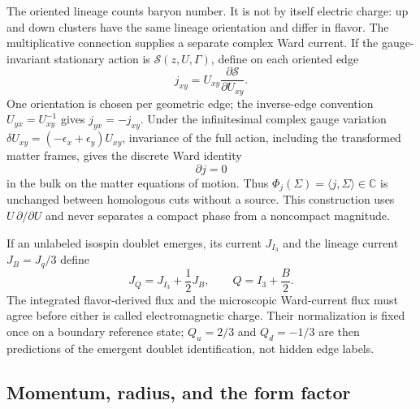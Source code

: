 \documentclass[11pt,letterpaper]{article}
\begin{document}
The oriented lineage counts baryon number. It is not by itself electric
charge: up and down clusters have the same lineage orientation and differ in
flavor. The multiplicative connection supplies a separate complex Ward
current. If the gauge-invariant stationary action is $\mathcal S(z,U,\Gamma)$,
define on each oriented edge
\begin{equation*}
  j_{xy}=U_{xy}\frac{\partial\mathcal S}{\partial U_{xy}} .
\end{equation*}
One orientation is chosen per geometric edge; the inverse-edge convention
$U_{yx}=U_{xy}^{-1}$ gives $j_{yx}=-j_{xy}$.
Under the infinitesimal complex gauge variation
$\delta U_{xy}=(-\epsilon_x+\epsilon_y)U_{xy}$, invariance of the full action, including
the transformed matter frames, gives the discrete Ward identity
\begin{equation*}
  \partial j=0
\end{equation*}
in the bulk on the matter equations of motion. Thus
$\Phi_j(\Sigma)=\langle j,\Sigma\rangle\in\mathbb C$ is unchanged between
homologous cuts without a source. This construction uses
$U\,\partial/\partial U$ and never separates a compact phase from a
noncompact magnitude.

If an unlabeled isospin doublet emerges, its current $J_{I_3}$ and the lineage
current $J_B=J_q/3$ define
\begin{equation*}
  J_Q=J_{I_3}+\frac{1}{2}J_B,
  \qquad Q=I_3+\frac{B}{2}.
\end{equation*}
The integrated flavor-derived flux and the microscopic Ward-current flux must
agree before either is called electromagnetic charge. Their normalization is
fixed once on a boundary reference state; $Q_u=2/3$ and $Q_d=-1/3$ are then
predictions of the emergent doublet identification, not hidden edge labels.

\subsection{Momentum, radius, and the form factor}
\end{document}
